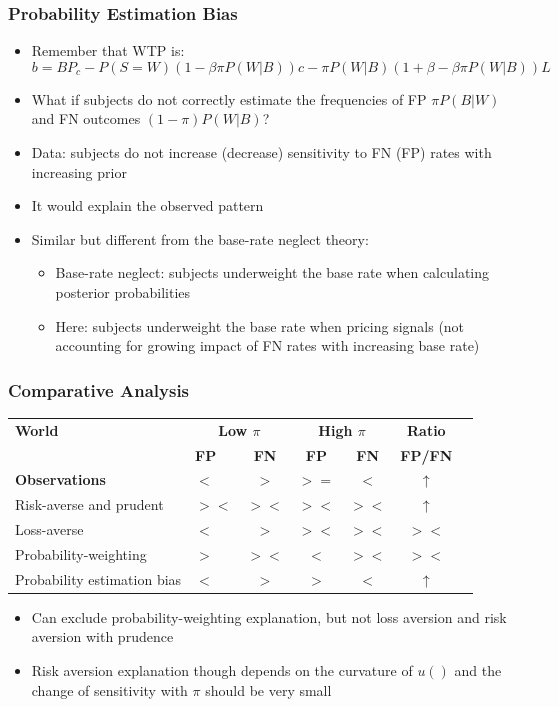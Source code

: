 \documentclass[11pt,hyperref={bookmarks=false}]{beamer}
\begin{document}
\begin{frame}
\frametitle{Probability Estimation Bias}
\begin{itemize}
\item Remember that WTP is:
\small
$$b=BP_c - P(S=W)(1-\beta \pi P(W|B))c-\pi P(W|B)(1+\beta-\beta \pi P(W|B))L$$
\normalsize
\item What if subjects do not correctly estimate the frequencies of FP $\pi P(B|W)$ and FN outcomes $(1-\pi)P(W|B)$?
\item Data: subjects do not increase (decrease) sensitivity to FN (FP) rates with increasing prior
\item It would explain the observed pattern
\item Similar but different from the base-rate neglect theory:
\begin{itemize}
\item Base-rate neglect: subjects underweight the base rate when calculating posterior probabilities
\item Here: subjects underweight the base rate when pricing signals (not accounting for growing impact of FN rates with increasing base rate)
\end{itemize}
\end{itemize}
\end{frame}



\begin{frame}
\frametitle{Comparative Analysis}
\footnotesize
\begin{table}[htbp]\centering
\begin{tabular}{l lc| c| c| c| c}
\hline \hline
\bf World & \multicolumn{2}{c}{\bf Low $\pi$} & \multicolumn{2}{c}{\bf High $\pi$} & \bf Ratio \\
\bf  & \bf FP& \bf FN & \bf FP & \bf FN &\bf FP/FN\\
\hline
\bf Observations & \bf $<$ & \bf $>$ & \bf $>=$ & \bf $<$ & \bf $\uparrow$ \\
\hline
Risk-averse and prudent & $><$ & $><$ & $><$ & $><$ & $\uparrow$ \\
Loss-averse &$<$ & $>$ & $><$ & $><$ & $><$\\
Probability-weighting & $>$ & $><$ &$<$ & $><$ & $><$ \\
Probability estimation bias & $<$ & $>$ &$>$ & $<$ & $\uparrow$ \\
\hline
\end{tabular}

\end{table}
\normalsize
\begin{itemize}
\item Can exclude probability-weighting explanation, but not loss aversion and risk aversion with prudence
\item Risk aversion explanation though depends on the curvature of $u()$ and the change of sensitivity with $\pi$ should be very small
\end{itemize}
\end{frame}
\end{document}
